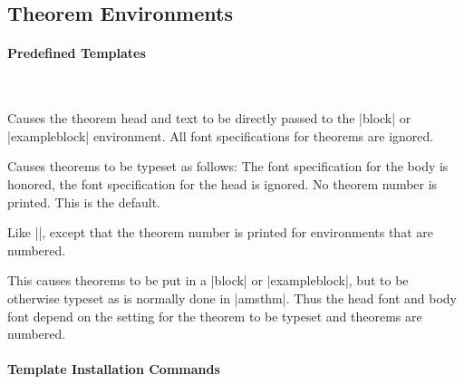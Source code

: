 \subsection{Theorem Environments}

\label{section-theorems-templates}

\paragraph{Predefined Templates}\

\begin{command}{\beamertemplatetheoremssimple}
  Causes the theorem head and text to be directly passed to the
  |block| or |exampleblock| environment. All font specifications for
  theorems are ignored. 
\end{command}

\begin{command}{\beamertemplatetheoremsunnumbered}
  Causes theorems to be typeset as follows: The font specification for
  the body is honored, the font specification for the head is
  ignored. No theorem number is printed. This is the default.
\end{command}

\begin{command}{\beamertemplatetheoremsnumbered}
  Like |\beamertemplatetheoremsunnumbered|, except that the theorem
  number is printed for environments that are numbered.
\end{command}

\begin{command}{\beamertemplatetheoremsamslike}
  This causes theorems to be put in a |block| or |exampleblock|, but
  to be otherwise typeset as is normally done in |amsthm|. Thus the
  head font and body font depend on the setting for the theorem to be
  typeset and theorems are numbered. 
\end{command}



\paragraph{Template Installation Commands}\

